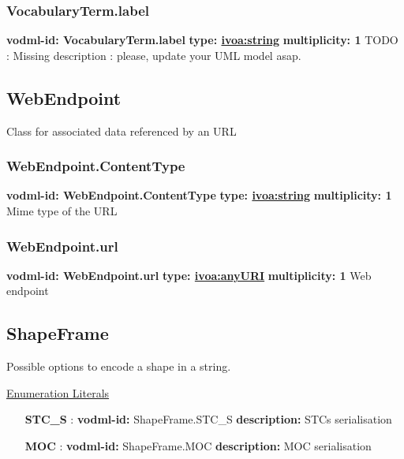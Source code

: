     \subsubsection{VocabularyTerm.label}
      \textbf{vodml-id: VocabularyTerm.label} \newline
      \textbf{type: \hyperref[sect:ivoa]{ivoa:string}} \newline
      \textbf{multiplicity: 1} \newline
      TODO : Missing description : please, update your UML model asap.

  \subsection{WebEndpoint}
  \label{sect:WebEndpoint}
    Class for associated data referenced by an URL

    \subsubsection{WebEndpoint.ContentType}
      \textbf{vodml-id: WebEndpoint.ContentType} \newline
      \textbf{type: \hyperref[sect:ivoa]{ivoa:string}} \newline
      \textbf{multiplicity: 1} \newline
      Mime type of the URL

    \subsubsection{WebEndpoint.url}
      \textbf{vodml-id: WebEndpoint.url} \newline
      \textbf{type: \hyperref[sect:ivoa]{ivoa:anyURI}} \newline
      \textbf{multiplicity: 1} \newline
      Web endpoint

  \subsection{ShapeFrame}
  \label{sect:ShapeFrame}

  Possible options to encode a shape in a string.

  \noindent \underline{Enumeration Literals}
  \vspace{-\parsep}
  \small
  \begin{itemize}

    \item[\textbf{STC\_S}]: \textbf{vodml-id:} ShapeFrame.STC\_S \newline
          \textbf{description:} STCs serialisation
    \item[\textbf{MOC}]: \textbf{vodml-id:} ShapeFrame.MOC \newline
          \textbf{description:} MOC serialisation
  \end{itemize}
  \normalsize


